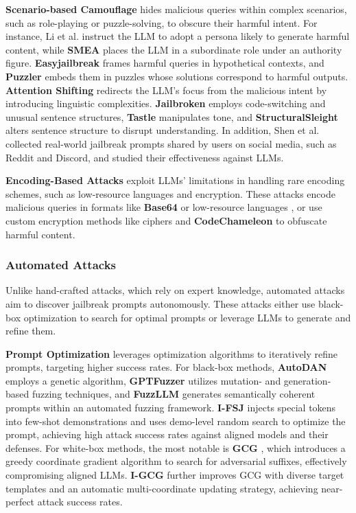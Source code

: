 \textbf{Scenario-based Camouflage} hides malicious queries within complex scenarios, such as role-playing or puzzle-solving, to obscure their harmful intent. For instance, Li et al. \cite{li2024cross} instruct the LLM to adopt a persona likely to generate harmful content, while \textbf{SMEA} \cite{zou2024system} places the LLM in a subordinate role under an authority figure. \textbf{Easyjailbreak} \cite{zhou2024easyjailbreak} frames harmful queries in hypothetical contexts, and \textbf{Puzzler} \cite{chang2024play} embeds them in puzzles whose solutions correspond to harmful outputs.
\textbf{Attention Shifting} redirects the LLM’s focus from the malicious intent by introducing linguistic complexities. \textbf{Jailbroken} \cite{wei2024jailbroken} employs code-switching and unusual sentence structures, \textbf{Tastle} \cite{xiao2024tastle} manipulates tone, and \textbf{StructuralSleight} \cite{li2024structuralsleight} alters sentence structure to disrupt understanding.
In addition, Shen et al.~\cite{SCBSZ24} collected real-world jailbreak prompts shared by users on social media, such as Reddit and Discord, and studied their effectiveness against LLMs.

\textbf{Encoding-Based Attacks} exploit LLMs' limitations in handling rare encoding schemes, such as low-resource languages and encryption. These attacks encode malicious queries in formats like \textbf{Base64} \cite{wei2024jailbroken} or low-resource languages \cite{yong2023low}, or use custom encryption methods like ciphers \cite{yuan2023gpt} and \textbf{CodeChameleon} \cite{lv2024codechameleon} to obfuscate harmful content.

\subsubsection{Automated Attacks}

Unlike hand-crafted attacks, which rely on expert knowledge, automated attacks aim to discover jailbreak prompts autonomously. These attacks either use black-box optimization to search for optimal prompts or leverage LLMs to generate and refine them.

\textbf{Prompt Optimization} leverages optimization algorithms to iteratively refine prompts, targeting higher success rates. For black-box methods, \textbf{AutoDAN} \cite{liu2023autodan} employs a genetic algorithm, \textbf{GPTFuzzer} \cite{yu2023gptfuzzer} utilizes mutation- and generation-based fuzzing techniques, and \textbf{FuzzLLM} \cite{yao2024fuzzllm} generates semantically coherent prompts within an automated fuzzing framework. 
\textbf{I-FSJ} \cite{zheng2024improved} injects special tokens into few-shot demonstrations and uses demo-level random search to optimize the prompt, achieving high attack success rates against aligned models and their defenses. 
For white-box methods, the most notable is \textbf{GCG} \cite{zou2023universal}, which introduces a greedy coordinate gradient algorithm to search for adversarial suffixes, effectively compromising aligned LLMs.
 \textbf{I-GCG} \cite{jia2024improved} further improves GCG with diverse target templates and an automatic multi-coordinate updating strategy, achieving near-perfect attack success rates.

